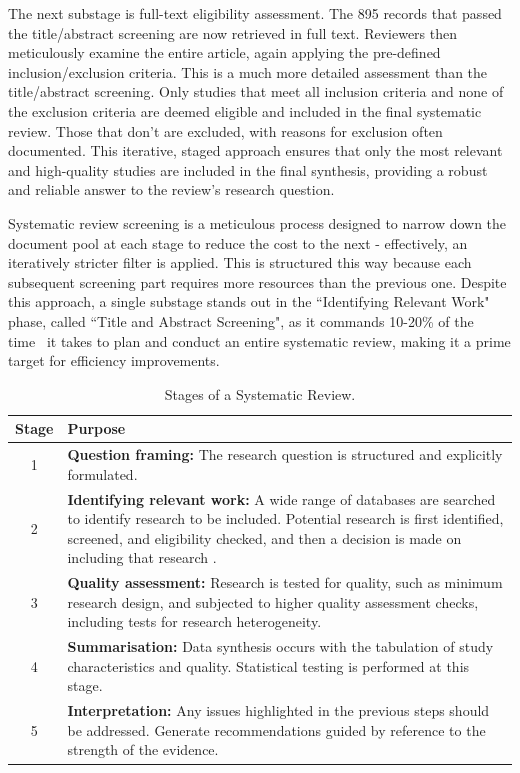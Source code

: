 \documentclass[10pt,oneside]{book}
\begin{document}
The next substage is full-text eligibility assessment. The 895 records that passed the title/abstract screening are now retrieved in full text. Reviewers then meticulously examine the entire article, again applying the pre-defined inclusion/exclusion criteria. This is a much more detailed assessment than the title/abstract screening. Only studies that meet all inclusion criteria and none of the exclusion criteria are deemed eligible and included in the final systematic review. Those that don't are excluded, with reasons for exclusion often documented. This iterative, staged approach ensures that only the most relevant and high-quality studies are included in the final synthesis, providing a robust and reliable answer to the review's research question.

Systematic review screening is a meticulous process designed to narrow down the document pool at each stage to reduce the cost to the next - effectively, an iteratively stricter filter is applied. This is structured this way because each subsequent screening part requires more resources than the previous one. Despite this approach, a single substage stands out in the ``Identifying Relevant Work" phase, called ``Title and Abstract Screening", as it commands 10-20\% of the time~\cite{haddaway_predicting_2019} it takes to plan and conduct an entire systematic review, making it a prime target for efficiency improvements. 

\begin{table}[t]
\centering
\small
\begin{tabular}{|c|p{}|}
\hline
\textbf{Stage} & \textbf{Purpose} \\
\hline
1 & \textbf{Question framing:} The research question is structured and explicitly formulated. \\\hline
2 & \textbf{Identifying relevant work:} A wide range of databases are searched to identify research to be included. Potential research is first identified, screened, and eligibility checked, and then a decision is made on including that research \cite{tawfik_step_2019}. \\\hline
3 & \textbf{Quality assessment:} Research is tested for quality, such as minimum research design, and subjected to higher quality assessment checks, including tests for research heterogeneity. \\\hline
4 & \textbf{Summarisation:} Data synthesis occurs with the tabulation of study characteristics and quality. Statistical testing is performed at this stage. \\\hline
5 & \textbf{Interpretation:} Any issues highlighted in the previous steps should be addressed. Generate recommendations guided by reference to the strength of the evidence. \\
\hline
\end{tabular}
\caption{Stages of a Systematic Review.}
\label{tab:stages_of_systematic review}
\end{table}
\end{document}

